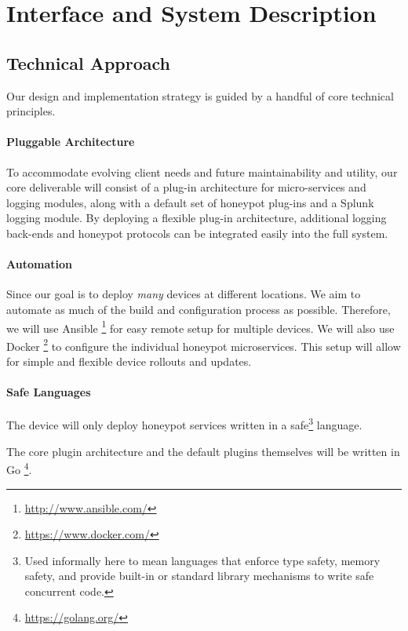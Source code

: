 \chapter{Interface and System Description}

\section{Technical Approach}

Our design and implementation strategy is guided by a handful of core
technical principles.

\subsubsection{Pluggable Architecture}

To accommodate evolving client needs and future maintainability and utility,
our core deliverable will consist of a plug-in architecture
for micro-services and logging modules, along with a default set of honeypot
plug-ins and a Splunk logging module. By deploying a flexible plug-in
architecture, additional logging back-ends and honeypot protocols can be
integrated easily into the full system.

\subsubsection{Automation}

Since our goal is to deploy \textit{many} devices at different
locations. We aim to automate as much of the build and configuration process
as possible. Therefore, we will use Ansible
\footnote{\url{http://www.ansible.com/}} for easy remote setup for
multiple devices. We will also use Docker
\footnote{\url{https://www.docker.com/}} to configure the individual
honeypot microservices. This setup will allow for simple and flexible device
rollouts and updates.

\subsubsection{Safe Languages}

The device will only deploy honeypot services written in a
safe\footnote{Used informally here to mean languages that enforce type
safety, memory safety, and provide built-in or standard library mechanisms to
write safe concurrent code.} language.

The core plugin architecture and the default plugins themselves will be written
in Go \footnote{\url{https://golang.org/}}.

